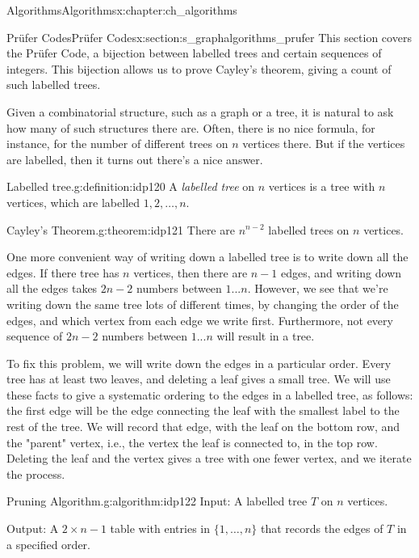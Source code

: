 \documentclass[oneside,10pt,]{book}
\numberwithin{equation}{section}
\begin{document}
\begin{chapterptx}{Algorithms}{}{Algorithms}{}{}{x:chapter:ch_algorithms}
\typeout{************************************************}
%
\begin{sectionptx}{Prüfer Codes}{}{Prüfer Codes}{}{}{x:section:s_graphalgorithms_prufer}
This section covers the Prüfer Code, a bijection between labelled trees and certain sequences of integers. This bijection allows us to prove Cayley's theorem, giving a count of such labelled trees.%
\par
Given a combinatorial structure, such as a graph or a tree, it is natural to ask how many of such structures there are.  Often, there is no nice formula, for instance, for the number of different trees on \(n\) vertices there.  But if the vertices are labelled, then it turns out there's a nice answer.%
\begin{definition}{Labelled tree.}{g:definition:idp120}%
A \emph{labelled tree} on \(n\) vertices is a tree with \(n\) vertices, which are labelled \(1,2,\dots,n.\)%
\end{definition}
\begin{theorem}{Cayley's Theorem.}{}{g:theorem:idp121}%
There are \(n^{n-2}\) labelled trees on \(n\) vertices.%
\end{theorem}
One more convenient way of writing down a labelled tree is to write down all the edges.  If there tree has \(n\) vertices, then there are \(n-1\) edges, and writing down all the edges takes \(2n-2\) numbers between \(1...n\).  However, we see that we're writing down the same tree lots of different times, by changing the order of the edges, and which vertex from each edge we write first.  Furthermore, not every sequence of \(2n-2\) numbers between \(1...n\) will result in a tree.%
\par
To fix this problem, we will write down the edges in a particular order.  Every tree has at least two leaves, and deleting a leaf gives a small tree.  We will use these facts to give a systematic ordering to the edges in a labelled tree, as follows: the first edge will be the edge connecting the leaf with the smallest label to the rest of the tree.  We will record that edge, with the leaf on the bottom row, and the "parent" vertex, i.e., the vertex the leaf is connected to, in the top row.  Deleting the leaf and the vertex gives a tree with one fewer vertex, and we iterate the process.%
\begin{algorithm}{Pruning Algorithm.}{}{g:algorithm:idp122}%
Input:  A labelled tree \(T\) on \(n\) vertices.%
\par
Output: A \(2\times n-1\) table with entries in \(\{1,\dots,n\}\) that records the edges of \(T\) in a specified order.%

\end{algorithm}
\end{sectionptx}
\end{chapterptx}
\end{document}
